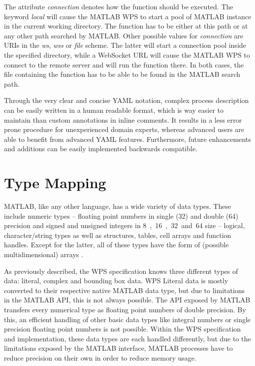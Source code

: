 		The attribute \emph{connection} denotes how the function should be executed. The keyword \emph{local} will cause the MATLAB WPS to start a pool of MATLAB instance in the current working directory. The function has to be either at this path or at any other path searched by MATLAB. Other possible values for \emph{connection} are URIs in the \emph{ws}, \emph{wss} or \emph{file} scheme. The latter will start a connection pool inside the specified directory, while a WebSocket URL will cause the MATLAB WPS to connect to the remote server and will run the function there. In both cases, the file containing the function has to be able to be found in the MATLAB search path.

		Through the very clear and concise YAML notation, complex process description can be easily written in a human readable format, which is way easier to maintain than custom annotations in inline comments. It results in a less error prone procedure for unexperienced domain experts, whereas advanced users are able to benefit from advanced YAML features. Furthermore, future enhancements and additions can be easily implemented backwards compatible.
	\section{Type Mapping}
		\label{sec:matlab:type}
		MATLAB, like any other language, has a wide variety of data types. These include numeric types -- floating point numbers in single (\unit{32}{\bit}) and double (\unit{64}{\bit}) precision and signed and unsigned integers in \unit{8, 16, 32 and 64}{\bit} size -- logical, character/string types as well as structures, tables, cell arrays and function handles. Except for the latter, all of these types have the form of (possible multidimensional) arrays \citep{matlab}.

		As previously described, the \acl{WPS} specification knows three different types of data: literal, complex and bounding box data.
		\ac{WPS} Literal data is mostly converted to their respective native MATLAB data type, but due to limitations in the MATLAB \ac{API}, this is not always possible. The \ac{API} exposed by MATLAB transfers every numerical type as floating point numbers of double precision. By this, an efficient handling of other basic data types like integral numbers or single precision floating point numbers is not possible. Within the WPS specification and implementation, these data types are each handled differently, but due to the limitations exposed by the MATLAB interface, MATLAB processes have to reduce precision on their own in order to reduce memory usage.

